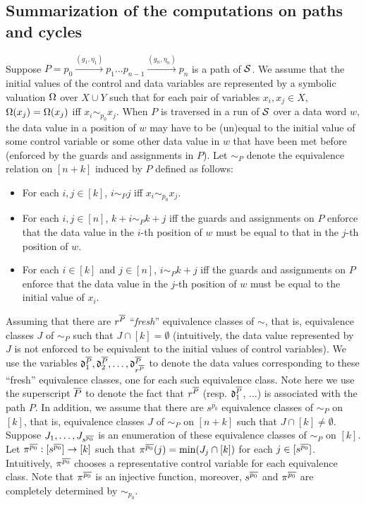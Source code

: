 
\subsection{Summarization of the computations on paths and cycles}\label{sec-sum}

Suppose $P=p_0 \xrightarrow{(g_1,\eta_1)} p_1 \dots p_{n-1} \xrightarrow{(g_n,\eta_n)} p_{n}$ is a path of ${\mathcal{S} }$. We assume that the initial values of the control and data variables are represented by a symbolic valuation $\Omega$ over $X \cup Y$ such that for each pair of variables $x_i, x_j \in X$, $\Omega(x_j)=\Omega(x_j)$ iff $x_i \sim_{p_0} x_j$. When $P$ is traversed in a run of ${\mathcal{S} }$ over a data word $w$,  the data value in a position of $w$ may have to be (un)equal to the initial value of some control variable or some other data value in $w$ that have been met before (enforced by the guards and assignments in $P$). Let $\sim_P$ denote the equivalence relation on $[n+k]$ induced by $P$ defined as follows: 
\begin{itemize}
\item For each $i, j \in [k]$, $i \sim_P j$ iff $x_i \sim_{p_0} x_j$.
%
\item For each $i, j \in [n]$, $k+i \sim_P k+j$ iff the guards and assignments on $P$ enforce that the data value in the $i$-th position of $w$ must be equal to that in the $j$-th position of $w$.
%
\item For each $i \in [k]$ and $j \in [n]$, $i \sim_P k+j$ iff the guards and assignments on $P$ enforce that the data value in the $j$-th position of $w$ must be equal to the initial value of $x_i$. 
\end{itemize}
Assuming that there are $r^{\overline{P}}$ ``\emph{fresh}'' equivalence classes of $\sim$, that is, equivalence classes $J$ of $\sim_P$ such that $J \cap [k] = \emptyset$ (intuitively, the data value represented by $J$ is not enforced to be equivalent to the initial values of control variables). 
We use the variables $\mathfrak{d}^{\overline{P}}_1,\mathfrak{d}^{\overline{P}}_2,\dots, \mathfrak{d}^{\overline{P}}_{r^{\overline{P}}}$ to denote the data values corresponding to these ``fresh'' equivalence classes, one for each such equivalence class. Note here we use the superscript ${\overline{P}}$ to denote the fact that $r^{\overline{P}}$ (resp. $\mathfrak{d}^{\overline{P}}_1$, $\dots$) is associated with the path $P$. In addition, we assume that there are $s^{\overline{p_0}}$ equivalence classes of $\sim_P$ on $[k]$, that is, equivalence classes $J$ of $\sim_P$ on $[n+k]$ such that $J \cap [k] \neq \emptyset$. Suppose $J_1,\dots, J_{s^{\overline{p_0}}}$ is an enumeration of these equivalence classes of $\sim_P$ on $[k]$. Let $\pi^{\overline{p_0}}: [s^{\overline{p_0}}] \rightarrow [k]$ such that $\pi^{\overline{p_0}}(j) = \min(J_j \cap [k])$ for each $j \in [s^{\overline{p_0}}]$. Intuitively, $\pi^{\overline{p_0}}$ chooses a representative control variable for each equivalence class. Note that $\pi^{\overline{p_0}}$ is an injective function, moreover, $s^{\overline{p_0}}$ and $\pi^{\overline{p_0}}$ are completely determined by $\sim_{p_0}$.
